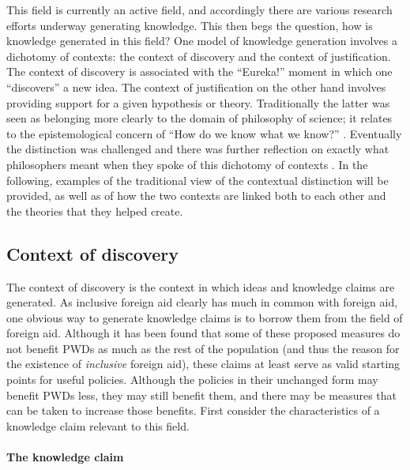 \documentclass[a4paper]{article}
\begin{document}
This field is currently an active field, and accordingly there are various
research efforts underway generating knowledge. This then begs the question,
how is knowledge generated in this field? One model of knowledge generation
involves a dichotomy of contexts: the context of discovery and the context of
justification. The context of discovery is associated with the ``Eureka!''
moment in which one ``discovers'' a new idea. The context of justification on
the other hand involves providing support for a given hypothesis or theory.
Traditionally the latter was seen as belonging more clearly to the domain of
philosophy of science; it relates to the epistemological concern of ``How do
we know what we know?'' \citep{schickore2014scientific}. Eventually the
distinction was challenged and there was further reflection on exactly what
philosophers meant when they spoke of this dichotomy of contexts
\citep{hoyningen2006context}. In the following, examples of the traditional
view of the contextual distinction will be provided, as well as of how the two
contexts are linked both to each other and the theories that they helped
create.

\subsection{Context of discovery}

The context of discovery is the context in which ideas and knowledge claims
are generated. As inclusive foreign aid clearly has much in common with
foreign aid, one obvious way to generate knowledge claims is to borrow them
from the field of foreign aid. Although it has been found that some of these
proposed measures do not benefit PWDs as much as the rest of the population
(and thus the reason for the existence of \emph{inclusive} foreign aid), these
claims at least serve as valid starting points for useful policies. Although
the policies in their unchanged form may benefit PWDs less, they may still
benefit them, and there may be measures that can be taken to increase those
benefits. First consider the characteristics of a knowledge claim relevant to
this field.


\paragraph{The knowledge claim}
\end{document}
